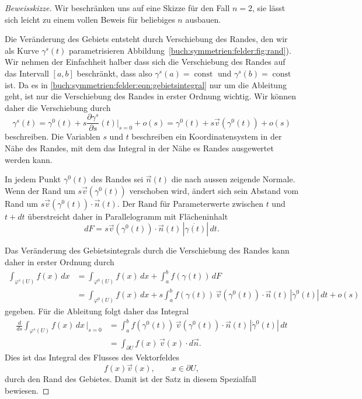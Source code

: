 \begin{proof}[Beweisskizze]
Wir beschränken uns auf eine Skizze für den Fall $n=2$, sie lässt
sich leicht zu einem vollen Beweis für beliebiges $n$ ausbauen.

Die Veränderung des Gebiets entsteht durch Verschiebung des Randes,
den wir als Kurve $\gamma^s(t)$ parametrisieren 
Abbildung~\ref{buch:symmetrien:felder:fig:rand}).
Wir nehmen der Einfachheit halber dass sich die Verschiebung des
Randes auf das Intervall $[a,b]$ beschränkt, dass also
$\gamma^s(a)=\operatorname{const}$
und
$\gamma^s(b)=\operatorname{const}$
ist.
Da es in \eqref{buch:symmetrien:felder:eqn:gebietsintegral}
nur um die Ableitung geht, ist nur die Verschiebung des Randes 
in erster Ordnung wichtig.
Wir können daher die Verschiebung durch
\[
\gamma^s(t) 
=
\gamma^0(t)
+
s \frac{\partial \gamma^s}{\partial s}(t) \bigg|_{s=0}
+ o(s)
=
\gamma^0(t)
+
s\vec{v}(\gamma^0(t))
+
o(s)
\]
beschreiben.
Die Variablen $s$ und $t$ beschreiben ein Koordinatensystem in der
Nähe des Randes, mit dem das Integral in der Nähe es Randes ausgewertet
werden kann.

In jedem Punkt $\gamma^0(t)$ des Randes sei $\vec{n}(t)$ die nach
aussen zeigende Normale.
Wenn der Rand um $s\vec{v}(\gamma^0(t))$ verschoben wird,
ändert sich sein Abstand vom Rand um 
$s\vec{v}(\gamma^0(t))\cdot \vec{n}(t)$.
Der Rand für Parameterwerte zwischen $t$ und $t+dt$ überstreicht
daher in Parallelogramm mit Flächeninhalt
\[
dF
=
s\vec{v}(\gamma^0(t))\cdot \vec{n}(t)
\,
|\dot{\gamma(t)}|
\,dt.
\]

Das Veränderung des Gebietsintegrals durch die Verschiebung des
Randes kann daher in erster Ordnung durch
\begin{align*}
\int_{\varphi^s(U)} f(x)\,dx
&=
\int_{\varphi^0(U)} f(x)\,dx
+
\int_a^b
f(\gamma(t))
\,dF
\\
&=
\int_{\varphi^0(U)} f(x)\,dx
+
s
\int_a^b
f(\gamma(t))
\,
\vec{v}(\gamma^0(t))
\cdot \vec{n}(t)
\,
|\dot{\gamma}^0(t)|
\,dt
+
o(s)
\end{align*}
gegeben.
Für die Ableitung folgt daher das Integral
\begin{align*}
\frac{d}{ds}
\int_{\varphi^s(U)} f(x)\,dx\,\bigg|_{s=0}
&=
\int_a^b
f(\gamma^0(t))
\,
\vec{v}(\gamma^0(t)) \cdot \vec{n}(t)
\,
|\dot{\gamma}^0(t)|\,dt
\\
&=
\int_{\partial U}
f(x)
\,
\vec{v}(x) \cdot
d\vec{n}.
\end{align*}
Dies ist das Integral des Flusses des Vektorfeldes 
\[
f(x)  \vec{v}(x),\qquad x\in\partial U,
\]
durch den Rand des Gebietes.
Damit ist der Satz in diesem Spezialfall bewiesen.
\end{proof}

